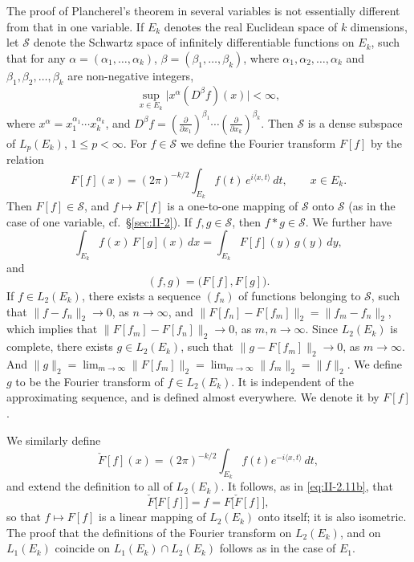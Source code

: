 The proof of Plancherel's theorem in several variables is not essentially different from that in one variable. If $E_{k}$ denotes the real Euclidean space of $k$ dimensions, let $\mathcal S$ denote the Schwartz space of infinitely differentiable functions on $E_{k}$, such that for any $\alpha=(\alpha_{1},\dots,\alpha_{k})$, $\beta=(\beta_{1},\dots,\beta_{k})$, where $\alpha_{1},\alpha_{2},\dots,\alpha_{k}$ and $\beta_{1},\beta_{2},\dots,\beta_{k}$ are non-negative integers,
\[
\sup_{x\in E_{k}}\bigl|x^{\alpha}(D^{\beta}f)(x)\bigr|<\infty,
\]
where $x^{\alpha}=x_{1}^{\alpha_{1}}\cdots x_{k}^{\alpha_{k}}$, and $D^{\beta}f=(\frac{\partial}{\partial x_{1}})^{\beta_{1}}\cdots(\frac{\partial}{\partial x_{k}})^{\beta_{k}}$. Then $\mathcal S$ is a dense subspace of $L_{p}(E_{k})$, $1\le p<\infty$. For $f\in\mathcal S$ we define the Fourier transform $F[f]$ by the relation
\[
F[f](x)=(2\pi)^{-k/2}\int_{E_{k}}f(t)\,e^{i\langle x,t\rangle}\,dt,\qquad x\in E_{k}.
\]
Then $F[f]\in\mathcal S$, and $f\mapsto F[f]$ is a one-to-one mapping of $\mathcal S$ onto $\mathcal S$ (as in the case of one variable, cf.\ \S\ref{sec:II-2}). If $f,g\in\mathcal S$, then $f*g\in\mathcal S$. We further have
\[
\int_{E_{k}}f(x)\,F[g](x)\,dx
=\int_{E_{k}}F[f](y)\,g(y)\,dy,
\]
and
\[
(f,g)=\bigl(F[f],F[g]\bigr).
\]
If $f\in L_{2}(E_{k})$, there exists a sequence $(f_{n})$ of functions belonging to $\mathcal S$, such that $\|f-f_{n}\|_{2}\to 0$, as $n\to\infty$, and $\|F[f_{n}]-F[f_{m}]\|_{2}=\|f_{m}-f_{n}\|_{2}$, which implies that $\|F[f_{m}]-F[f_{n}]\|_{2}\to 0$, as $m,n\to\infty$. Since $L_{2}(E_{k})$ is complete, there exists $g\in L_{2}(E_{k})$, such that $\|g-F[f_{m}]\|_{2}\to 0$, as $m\to\infty$. And $\|g\|_{2}=\lim_{m\to\infty}\|F[f_{m}]\|_{2}=\lim_{m\to\infty}\|f_{m}\|_{2}=\|f\|_{2}$. We define $g$ to be the Fourier transform of $f\in L_{2}(E_{k})$. It is independent of the approximating sequence, and is defined almost everywhere. We denote it by $F[f]$.

We similarly define
\[
\check F[f](x)=(2\pi)^{-k/2}\int_{E_{k}}f(t)e^{-i\langle x,t\rangle}\,dt,
\]
and extend the definition to all of $L_{2}(E_{k})$. It follows, as in \eqref{eq:II-2.11b}, that
\[
\check F\bigl[F[f]\bigr]=f=F\bigl[\check F[f]\bigr],
\]
so that $f\mapsto F[f]$ is a linear mapping of $L_{2}(E_{k})$ onto itself; it is also isometric. The proof that the definitions of the Fourier transform on $L_{2}(E_{k})$, and on $L_{1}(E_{k})$ coincide on $L_{1}(E_{k})\cap L_{2}(E_{k})$ follows as in the case of $E_{1}$.
